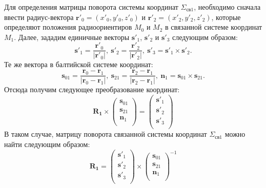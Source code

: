 \documentclass[a4paper,12pt]{article}
\begin{document}
Для определения матрицы поворота системы координат $\Sigma_{\text{св}1}$, необходимо сначала
ввести радиус-вектора $\mathbf{r}'_0 = \left(x'_0, y'_0, z'_0\right)$ и
$\mathbf{r}'_2 = \left(x'_2, y'_2, z'_2\right)$, которые определяют положения радиоориентиров
$M_0$ и $M_2$ в связанной системе координат $M_1$. Далее, зададим единичные векторы
$\mathbf{s}'_1$, $\mathbf{s}'_2$ и $\mathbf{s}'_3$ следующим образом:
\begin{equation}
    \mathbf{s}'_1 = \frac{\mathbf{r}'_0}{|\mathbf{r}'_0|},\
    \mathbf{s}'_2 = \frac{\mathbf{r}'_2}{|\mathbf{r}'_2|},\
    \mathbf{s}'_3 = \mathbf{s}'_1 \times \mathbf{s}'_2.
\end{equation}
Те же вектора в балтийской системе координат:
\begin{equation}
    \mathbf{s}_{01} = \frac{\mathbf{r}_0 - \mathbf{r}_1}{|\mathbf{r}_0 - \mathbf{r}_1|},\
    \mathbf{s}_{21} = \frac{\mathbf{r}_2 - \mathbf{r}_1}{|\mathbf{r}_2 - \mathbf{r}_1|},\
    \mathbf{n}_1 = \mathbf{s}_{01} \times \mathbf{s}_{21}.
\end{equation}
Отсюда получим следующее преобразование координат:
\begin{equation}
    \mathbf{R_1} \times
    \left(
    \begin{matrix}
        \mathbf{s}_{01} \\
        \mathbf{s}_{21} \\
        \mathbf{n}_1 \\
    \end{matrix}
    \right) =
    \left(
    \begin{matrix}
        \mathbf{s}'_1 \\
        \mathbf{s}'_2 \\
        \mathbf{s}'_3 \\
    \end{matrix}
    \right)
\end{equation}
В таком случае, матрицу поворота связанной системы координат $\Sigma_{\text{св}1}$ можно найти следующим образом:
\begin{equation}
    \mathbf{R_1} =
    \left(
    \begin{matrix}
        \mathbf{s}'_1 \\
        \mathbf{s}'_2 \\
        \mathbf{s}'_3 \\
    \end{matrix}
    \right) \times
    \left(
    \begin{matrix}
        \mathbf{s}_{01} \\
        \mathbf{s}_{21} \\
        \mathbf{n}_1 \\
    \end{matrix}
    \right)^{-1}
\end{equation}
\end{document}
